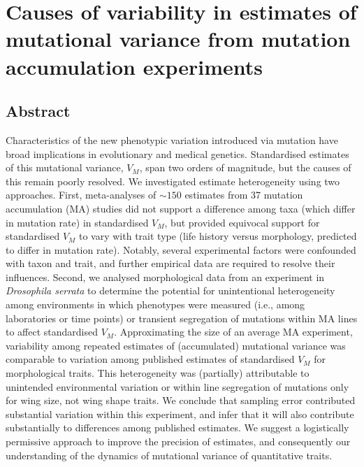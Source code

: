 \chapter{Causes of variability in estimates of mutational variance from mutation accumulation experiments} 
 \vspace{2cm}
\section{Abstract} 
Characteristics of the new phenotypic variation introduced via mutation have broad implications in evolutionary and medical genetics. Standardised estimates of this mutational variance, $V_M$, span two orders of magnitude, but the causes of this remain poorly resolved. We investigated estimate heterogeneity using two approaches. First, meta-analyses of $\sim150$ estimates from 37 mutation accumulation (MA) studies did not support a difference among taxa (which differ in mutation rate) in standardised $V_M$, but provided equivocal support for standardised $V_M$ to vary with trait type (life history versus morphology, predicted to differ in mutation rate). Notably, several experimental factors were confounded with taxon and trait, and further empirical data are required to resolve their influences. Second, we analysed morphological data from an experiment in \textit{Drosophila serrata} to determine the potential for unintentional heterogeneity among environments in which phenotypes were measured (i.e., among laboratories or time points) or transient segregation of mutations within MA lines to affect standardised $V_M$. Approximating the size of an average MA experiment, variability among repeated estimates of (accumulated) mutational variance was comparable to variation among published estimates of standardised $V_M$ for morphological traits. This heterogeneity was (partially) attributable to unintended environmental variation or within line segregation of mutations only for wing size, not wing shape traits. We conclude that sampling error contributed substantial variation within this experiment, and infer that it will also contribute substantially to differences among published estimates. We suggest a logistically permissive approach to improve the precision of estimates, and consequently our understanding of the dynamics of mutational variance of quantitative traits. \par 

\newpage
 	 
